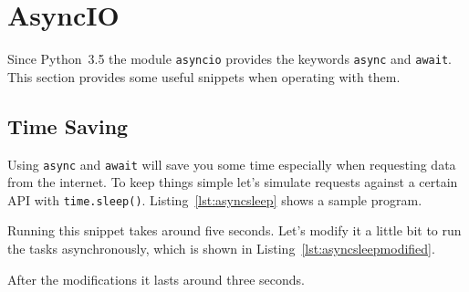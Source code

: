
\section{AsyncIO}

Since Python~3.5 the module \lstinline{asyncio} provides the keywords \lstinline{async} and \lstinline{await}.
This section provides some useful snippets when operating with them.


\subsection{Time Saving}

Using \lstinline{async} and \lstinline{await} will save you some time especially when requesting data from the internet.
To keep things simple let's simulate requests against a certain API with \lstinline{time.sleep()}.
Listing~\ref{lst:asyncsleep} shows a sample program.



Running this snippet takes around five seconds.
Let's modify it a little bit to run the tasks asynchronously, which is shown in Listing~\ref{lst:asyncsleepmodified}.



After the modifications it lasts around three seconds.
